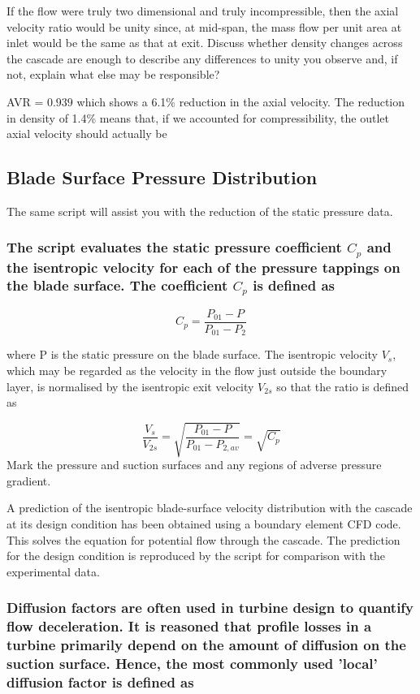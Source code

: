\documentclass{article}
\begin{document}
If the flow were truly two dimensional and truly incompressible, then the axial velocity ratio
would be unity since, at mid-span, the mass flow per unit area at inlet would be the same as
that at exit. Discuss whether density changes across the cascade are enough to describe any
differences to unity you observe and, if not, explain what else may be responsible?

AVR = $0.939$ which shows a 6.1\% reduction in the axial velocity.
The reduction in density of 1.4\% means that, if we accounted for compressibility, the outlet axial velocity should actually be 


\subsection{Blade Surface Pressure Distribution}

The same script will assist you with the reduction of the static pressure data.
\subsubsection{The script evaluates the static pressure coefficient $C_p$ and the isentropic velocity for
each of the pressure tappings on the blade surface. The coefficient $C_p$ is defined as}

\begin{equation}
    C_p = \frac{P_{01} - P}{P_{01} - P_2}
\end{equation}

where P is the static pressure on the blade surface. The isentropic velocity
$V_s$, which may be
regarded as the velocity in the flow just outside the boundary layer, is normalised by the
isentropic exit velocity
$V_{2s}$ so that the ratio is defined as

\begin{equation}
    \frac{V_s}{V_{2s}} = \sqrt{\frac{P_{01} - P}{P_{01} - P_{2,av}}} = \sqrt{C_p}
\end{equation}
Mark the pressure and suction surfaces and any regions of adverse pressure gradient.

A prediction of the isentropic blade-surface velocity distribution with the cascade at its
design condition has been obtained using a boundary element CFD code. This solves the
equation for potential flow through the cascade. The prediction for the design condition is
reproduced by the script for comparison with the experimental data.

\subsubsection{Diffusion factors are often used in turbine design to quantify flow deceleration. It is
reasoned that profile losses in a turbine primarily depend on the amount of diffusion on the
suction surface. Hence, the most commonly used 'local' diffusion factor is defined as
}
\end{document}
